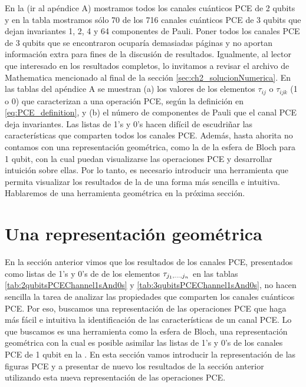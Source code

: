 En la  (ir al apéndice A) mostramos
todos los canales cuánticos PCE de 2 qubits y en la tabla 
 mostramos sólo 
70 de los 716 canales cuánticos PCE de 3 qubits que dejan invariantes 
1, 2, 4 y 64 componentes de Pauli. Poner todos los canales PCE de 3 
qubits que se encontraron ocuparía demasiadas páginas y no aportan 
información extra para fines de la discusión de resultados.
Igualmente, al lector que interesado en los resultados completos,
lo invitamos a revisar el archivo de Mathematica mencionado 
al final de la sección \ref{sec:ch2_solucionNumerica}. 
En las tablas del apéndice A se muestran
(a) los valores de los elementos $\tau_{ij}$ o $\tau_{ijk}$ (1 o 0) que caracterizan 
a una operación PCE, según la definición en \eqref{eq:PCE_definition},
y (b) el número de componentes de Pauli que el canal PCE
deja invariantes. Las listas de 1's y 0's hacen difícil de escudriñar
las características que comparten todos los canales PCE.
Además, hasta ahorita no contamos con una representación geométrica, 
como la de la esfera de Bloch para 1 qubit, con la cual puedan visualizarse 
las operaciones PCE y desarrollar intuición sobre ellas.
Por lo tanto, es necesario introducir una herramienta
que permita visualizar los resultados de la 
de una forma más sencilla e intuitiva. Hablaremos de una herramienta geométrica
en la próxima sección.

\section{Una representación geométrica}\label{sec:ch3_geometric_representation}

En la sección anterior vimos que los resultados de los canales PCE,
presentados como listas de 1's y 0's 
de de los elementos $\tau_{j_1,\ldots ,j_n}$ en las tablas \ref{tab:2qubitsPCEChannel1sAnd0s} y 
\ref{tab:3qubitsPCEChannel1sAnd0s}, no hacen sencilla la tarea de analizar 
las propiedades que comparten los canales cuánticos PCE. Por eso, 
buscamos una representación de las operaciones PCE que haga más fácil 
e intuitiva la identificación de las características de un canal PCE. 
Lo que buscamos es una herramienta como la esfera de Bloch, 
una representación geométrica con la cual es posible asimilar las listas 
de 1's y 0's de los canales PCE de 1 qubit en la .  
En esta sección vamos introducir la representación de las figuras PCE 
y a presentar de nuevo los resultados de la sección anterior 
utilizando esta nueva representación de las operaciones PCE.


